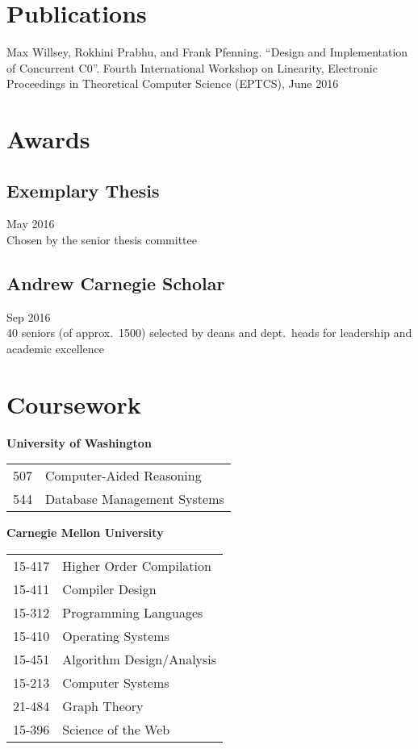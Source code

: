 \documentclass{article}
\begin{document}
\section{Publications}

Max Willsey, Rokhini Prabhu, and Frank Pfenning.
``Design and Implementation of Concurrent C0''.
Fourth International Workshop on Linearity, Electronic Proceedings in Theoretical Computer Science (EPTCS), June 2016

\section{Awards}

\subsection{Exemplary Thesis}
\hfill May 2016 \\
Chosen by the senior thesis committee

\subsection{Andrew Carnegie Scholar}
\hfill Sep 2016 \\
40 seniors (of approx.~1500) selected by deans and dept.\ heads for leadership and academic excellence

\section{Coursework}


\begin{minipage}[t]{0.45\linewidth}
  \raggedright
  \textbf{University of Washington}
  \begin{tabular}{ll}
    507 & Computer-Aided Reasoning \\
    544 & Database Management Systems \\
  \end{tabular}
\end{minipage}
\hfill
\begin{minipage}[t]{0.45\linewidth}
  \raggedright
  \textbf{Carnegie Mellon University}
  \begin{tabular}{ll}
    15-417 & Higher Order Compilation  \\
    15-411 & Compiler Design                 \\
    15-312 & Programming Languages           \\
    15-410 & Operating Systems               \\
    15-451 & Algorithm Design/Analysis   \\
    15-213 & Computer Systems                \\
    21-484 & Graph Theory                    \\
    15-396 & Science of the Web              \\
  \end{tabular}
\end{minipage}
\end{document}
